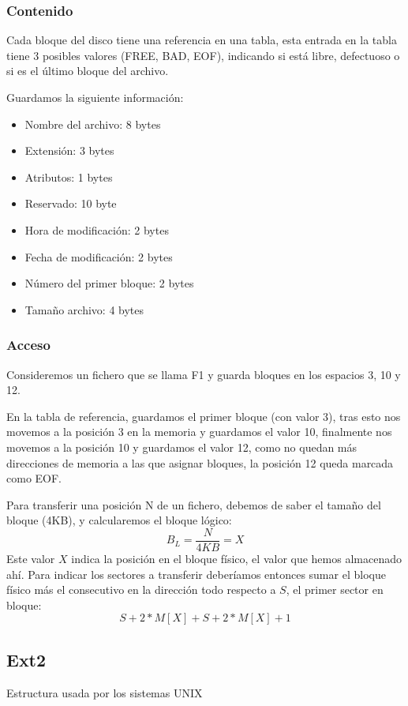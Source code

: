 \subsubsection{Contenido}
\noindent Cada bloque del disco tiene una referencia en una tabla, esta entrada en la tabla tiene 3 posibles valores (FREE, BAD, EOF), indicando si está libre, defectuoso o si es el último bloque del archivo.
\par \noindent Guardamos la siguiente información:
\begin{itemize}
        \item Nombre del archivo: 8 bytes
        \item Extensión: 3 bytes
        \item Atributos: 1 bytes
        \item Reservado: 10 byte
        \item Hora de modificación: 2 bytes
        \item Fecha de modificación: 2 bytes
        \item Número del primer bloque: 2 bytes
        \item Tamaño archivo: 4 bytes
\end{itemize}
\subsubsection{Acceso}
\noindent Consideremos un fichero que se llama F1 y guarda bloques en los espacios 3, 10 y 12.
\par \noindent En la tabla de referencia, guardamos el primer bloque (con valor 3), tras esto nos movemos a la posición 3 en la memoria y guardamos el valor 10, finalmente nos movemos a la posición 10 y guardamos el valor 12, como no quedan más direcciones de memoria a las que asignar bloques, la posición 12 queda marcada como EOF.
\par \noindent Para transferir una posición N de un fichero, debemos de saber el tamaño del bloque (4KB), y calcularemos el bloque lógico:
\[
        \boxed{B_L = \frac{N}{4KB} = X}
\]
\noindent Este valor \(X\) indica la posición en el bloque físico, el valor que hemos almacenado ahí. Para indicar los sectores a transferir deberíamos entonces sumar el bloque físico más el consecutivo en la dirección todo respecto a \(S\), el primer sector en bloque:
\[
        \boxed{S + 2*M[X] + S + 2*M[X] + 1}
\]
\subsection{Ext2}
\noindent Estructura usada por los sistemas UNIX
